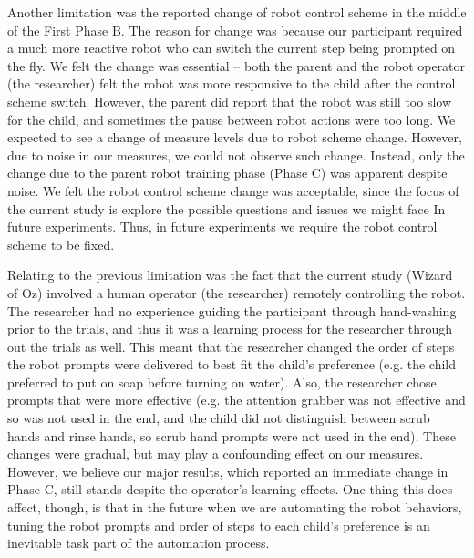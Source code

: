 \documentclass{ut-thesis}
\begin{document}
Another limitation was the reported change of robot control scheme in the middle of the First Phase B.  The reason for change was because our participant required a much more reactive robot who can switch the current step being prompted on the fly.  We felt the change was essential -- both the parent and the robot operator (the researcher) felt the robot was more responsive to the child after the control scheme switch.  However, the parent did report that the robot was still too slow for the child, and sometimes the pause between robot actions were too long.  We expected to see a change of measure levels due to robot scheme change.  However, due to noise in our measures, we could not observe such change.  Instead, only the change due to the parent robot training phase (Phase C) was apparent despite noise.  We felt the robot control scheme change was acceptable, since the focus of the current study is explore the possible questions and issues we might face In future experiments.  Thus, in future experiments we require the robot control scheme to be fixed.

Relating to the previous limitation was the fact that the current study (Wizard of Oz) involved a human operator (the researcher) remotely controlling the robot.  The researcher had no experience guiding the participant through hand-washing prior to the trials, and thus it was a learning process for the researcher through out the trials as well.  This meant that the researcher changed the order of steps the robot prompts were delivered to best fit the child's preference (e.g. the child preferred to put on soap before turning on water).  Also, the researcher chose prompts that were more effective (e.g. the attention grabber was not effective and so was not used in the end, and the child did not distinguish between scrub hands and rinse hands, so scrub hand prompts were not used in the end).  These changes were gradual, but may play a confounding effect on our measures.  However, we believe our major results, which reported an immediate change in Phase C, still stands despite the operator's learning effects.  One thing this does affect, though, is that in the future when we are automating the robot behaviors, tuning the robot prompts and order of steps to each child's preference is an inevitable task part of the automation process.
\end{document}
